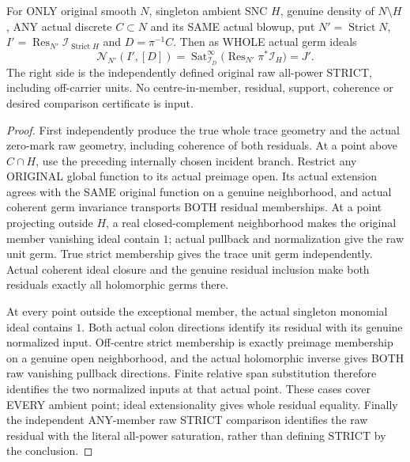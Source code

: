 \begin{theorem}
\label{hir:sharp-actual-mixed-discrete-whole-trace-residual-eq-raw-strict}
\leanok
For ONLY original smooth $N$, singleton ambient SNC $H$, genuine density
of $N\setminus H$, ANY actual discrete $C\subset N$ and its SAME actual
blowup, put $N'=\operatorname{Strict}N$,
$I'=\operatorname{Res}_{N'}\mathcal I_{\operatorname{Strict}H}$ and
$D=\pi^{-1}C$. Then as WHOLE actual germ ideals
\[
 \mathcal N_{N'}(I',[D])
 =\operatorname{Sat}_{\mathcal I_D}^{\infty}
       \bigl(\operatorname{Res}_{N'}\pi^*\mathcal I_H\bigr)=J'.
\]
The right side is the independently defined original raw all-power STRICT,
including off-carrier units. No centre-in-member, residual, support,
coherence or desired comparison certificate is input.
\end{theorem}
\begin{proof}
First independently produce the true whole trace geometry and the actual
zero-mark raw geometry, including coherence of both residuals. At a point
above $C\cap H$, use the preceding internally chosen incident branch.
Restrict any ORIGINAL global function to its actual preimage open. Its
actual extension agrees with the SAME original function on a genuine
neighborhood, and actual coherent germ invariance transports BOTH residual
memberships. At a point projecting outside $H$, a real closed-complement
neighborhood makes the original member vanishing ideal contain $1$;
actual pullback and normalization give the raw unit germ. True strict
membership gives the trace unit germ independently. Actual coherent ideal
closure and the genuine residual inclusion make both residuals exactly all
holomorphic germs there.

At every point outside the exceptional member, the actual singleton
monomial ideal contains $1$. Both actual colon directions identify its
residual with its genuine normalized input. Off-centre strict membership
is exactly preimage membership on a genuine open neighborhood, and the
actual holomorphic inverse gives BOTH raw vanishing pullback directions.
Finite relative span substitution therefore identifies the two normalized
inputs at that actual point. These cases cover EVERY ambient point;
ideal extensionality gives whole residual equality. Finally the independent
ANY-member raw STRICT comparison identifies the raw residual with the
literal all-power saturation, rather than defining STRICT by the conclusion.
\end{proof}

